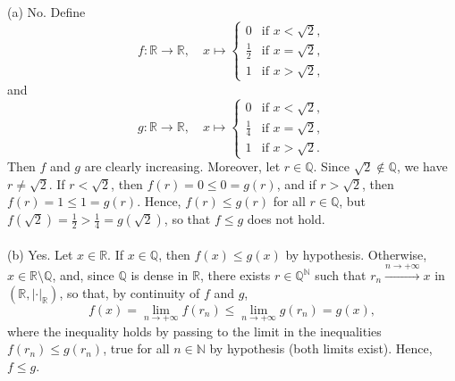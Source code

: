 \begin{solution}
    (a) No. Define
    \[
        f \colon \mathbb{R} \longrightarrow \mathbb{R}, \quad x \longmapsto
        \begin{cases}
            0 & \text{if } x < \sqrt{2}, \\
            \frac{1}{2} & \text{if } x = \sqrt{2}, \\
            1 & \text{if } x > \sqrt{2},
        \end{cases}
    \]
    and
    \[
        g \colon \mathbb{R} \longrightarrow \mathbb{R}, \quad x \longmapsto
        \begin{cases}
            0 & \text{if } x < \sqrt{2}, \\
            \frac{1}{4} & \text{if } x = \sqrt{2}, \\
            1 & \text{if } x > \sqrt{2}.
        \end{cases}
    \]
    Then \( f \) and \( g \) are clearly increasing. Moreover, let \( r \in \mathbb{Q} \). Since \( \sqrt{2} \notin \mathbb{Q} \), we have \( r \neq \sqrt{2} \). If \( r < \sqrt{2} \), then \( f\left(r\right) = 0 \leq 0 = g\left(r\right) \), and if \( r > \sqrt{2} \), then \( f\left(r\right) = 1 \leq 1 = g\left(r\right) \). Hence, \( f\left(r\right) \leq g\left(r\right) \) for all \( r \in \mathbb{Q} \), but \( f\left(\sqrt{2}\right) = \frac{1}{2} > \frac{1}{4} = g\left(\sqrt{2}\right) \), so that \( f \leq g \) does not hold.
    \\\\
    (b) Yes. Let \( x \in \mathbb{R} \). If \( x \in \mathbb{Q} \), then \( f\left(x\right) \leq g\left(x\right) \) by hypothesis. Otherwise, \( x \in \mathbb{R} \setminus \mathbb{Q} \), and, since \( \mathbb{Q} \) is dense in \( \mathbb{R} \), there exists \( r \in \mathbb{Q}^{\mathbb{N}} \) such that \( r_n \overset{n \to +\infty}{\longrightarrow} x \) in \( \left(\mathbb{R},\left|\cdot\right|_{\mathbb{R}}\right) \), so that, by continuity of \( f \) and \( g \),
    \[
        f\left(x\right) = \lim_{n \to +\infty} f\left(r_n\right) \leq \lim_{n \to +\infty} g\left(r_n\right) = g\left(x\right),
    \]
    where the inequality holds by passing to the limit in the inequalities \( f\left(r_n\right) \leq g\left(r_n\right) \), true for all \( n \in \mathbb{N} \) by hypothesis (both limits exist). Hence, \( f \leq g \).
\end{solution}
